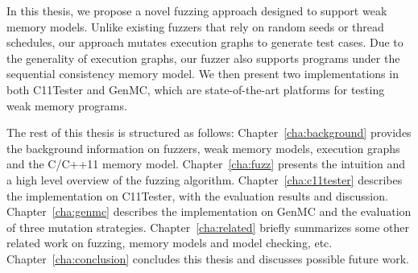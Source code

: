 
In this thesis, we propose a novel fuzzing approach designed to support weak memory models. Unlike existing fuzzers that rely on random seeds or thread schedules, our approach mutates execution graphs to generate test cases. Due to the generality of execution graphs, our fuzzer also supports programs under the sequential consistency memory model. We then present two implementations in both C11Tester and GenMC, which are state-of-the-art platforms for testing weak memory programs.


The rest of this thesis is structured as follows: Chapter~\ref{cha:background} provides the background information on fuzzers, weak memory models, execution graphs and the C/C++11 memory model. Chapter~\ref{cha:fuzz} presents the intuition and a high level overview of the fuzzing algorithm. Chapter~\ref{cha:c11tester} describes the implementation on C11Tester, with the evaluation results and discussion. Chapter~\ref{cha:genmc} describes the implementation on GenMC and the evaluation of three mutation strategies. Chapter~\ref{cha:related} briefly summarizes some other related work on fuzzing, memory models and model checking, etc. Chapter~\ref{cha:conclusion} concludes this thesis and discusses possible future work. 





